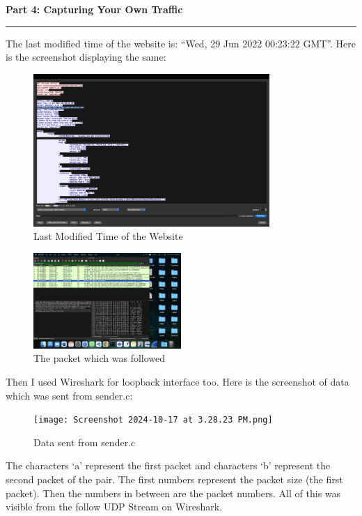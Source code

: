 \documentclass[a4paper,12pt]{article}
\newenvironment{solution}[2][]{%
    \begin{mdframed}[linecolor=blue!70!black, linewidth=2pt, roundcorner=10pt, backgroundcolor=yellow!10!white, skipabove=12pt, skipbelow=12pt]%
        \textbf{\large #2}
        \par\noindent\rule{\textwidth}{0.4pt}
}{
    \end{mdframed}
}
\begin{document}
\begin{solution}{Part 4: Capturing Your Own Traffic}

    The last modified time of the website is: ``Wed, 29 Jun 2022 00:23:22 GMT''. Here is the screenshot displaying the same:
    \begin{figure}[H]
        \centering
        \includegraphics[width=0.8\textwidth]{lab6p21.png}
        \caption{Last Modified Time of the Website}
    \end{figure}

    \begin{figure}[H]
        \centering
        \includegraphics[width=0.5\textwidth]{lab6p22.png}
        \caption{The packet which was followed}
    \end{figure}

    Then I used Wireshark for loopback interface too. Here is the screenshot of data which was sent from sender.c:

    \begin{figure}[H]
        \centering
        \texttt{[image: Screenshot 2024-10-17 at 3.28.23 PM.png]}
        \caption{Data sent from sender.c}
    \end{figure}
    The characters `a' represent the first packet and characters `b' represent the second packet of the pair. The first numbers represent the packet size (the first packet). Then the numbers in between are the packet numbers. All of this was visible from the follow UDP Stream on Wireshark.
\end{solution}
\end{document}
